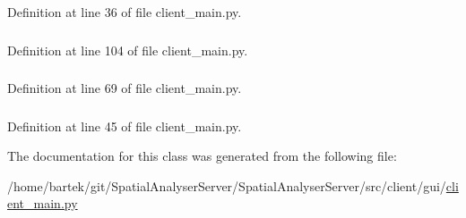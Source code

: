 Definition at line 36 of file client\_\-main.py.

\hypertarget{classsrc_1_1client_1_1gui_1_1client__main_1_1Ui__MainWindow_a5a75dff52a6fd3d0f75398a7546c2073}{
\subsubsection[{sh}]{}}
\label{classsrc_1_1client_1_1gui_1_1client__main_1_1Ui__MainWindow_a5a75dff52a6fd3d0f75398a7546c2073}


Definition at line 104 of file client\_\-main.py.

\hypertarget{classsrc_1_1client_1_1gui_1_1client__main_1_1Ui__MainWindow_a78cf83322a3b146f95758fcadecbb0c7}{
\subsubsection[{statusbar}]{}}
\label{classsrc_1_1client_1_1gui_1_1client__main_1_1Ui__MainWindow_a78cf83322a3b146f95758fcadecbb0c7}


Definition at line 69 of file client\_\-main.py.

\hypertarget{classsrc_1_1client_1_1gui_1_1client__main_1_1Ui__MainWindow_ae6326ea0e448535ddce717d41dd74d77}{
\subsubsection[{widget}]{}}
\label{classsrc_1_1client_1_1gui_1_1client__main_1_1Ui__MainWindow_ae6326ea0e448535ddce717d41dd74d77}


Definition at line 45 of file client\_\-main.py.



The documentation for this class was generated from the following file:\begin{DoxyCompactItemize}
\item 
/home/bartek/git/SpatialAnalyserServer/SpatialAnalyserServer/src/client/gui/\hyperlink{client__main_8py}{client\_\-main.py}\end{DoxyCompactItemize}
